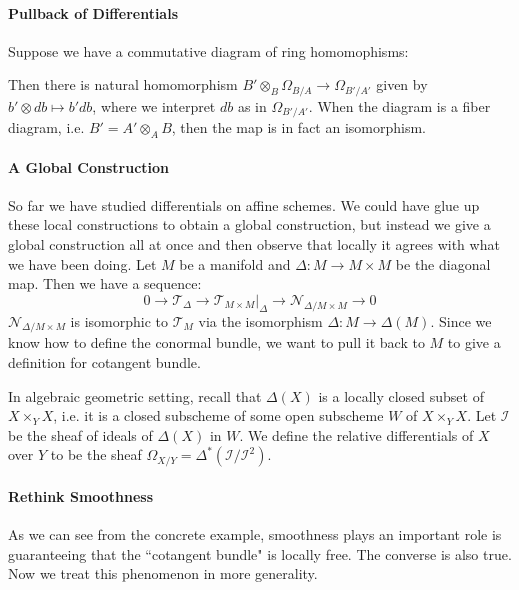 \documentclass[12pt]{article}
\theoremstyle{plain}
\theoremstyle{definition}
\newcommand{\shI}{\mathscr{I}}
\newcommand{\shN}{\mathscr{N}}
\newcommand{\shT}{\mathscr{T}}
\newcommand\tensor{{\otimes}}
\newcommand{\<}{\langle}
\renewcommand{\>}{\rangle}
\newcommand{\Ohm}{\Omega}
\begin{document}
\paragraph{Pullback of Differentials}
Suppose we have a commutative diagram of ring homomophisms: 
\begin{center}
\end{center}
Then there is natural homomorphism $B' \tensor_B \Ohm_{B/A} \to \Ohm_{B'/A'}$ given by $b' \tensor db \mapsto b' db$, where we interpret $db$ as in $\Ohm_{B'/A'}$. When the diagram is a fiber diagram, i.e. $B' = A' \tensor_A B$, then the map is in fact an isomorphism. 



\paragraph{A Global Construction} So far we have studied differentials on affine schemes. We could have glue up these local constructions to obtain a global construction, but instead we give a global construction all at once and then observe that locally it agrees with what we have been doing. Let $M$ be a manifold and $\Delta : M \to M \times M$ be the diagonal map. Then we have a sequence:
$$ 0 \to \shT_\Delta \to \shT_{M \times M}|_{\Delta} \to \shN_{\Delta/M \times M} \to 0$$
$\shN_{\Delta/M \times M}$ is isomorphic to $\shT_M$ via the isomorphism $\Delta : M \to \Delta(M)$. Since we know how to define the conormal bundle, we want to pull it back to $M$ to give a definition for cotangent bundle. 

In algebraic geometric setting, recall that $\Delta(X)$ is a locally closed subset of $X \times_Y X$, i.e. it is a closed subscheme of some open subscheme $W$ of $X \times_Y X$. Let $\shI$ be the sheaf of ideals of $\Delta(X)$ in $W$. We define the relative differentials of $X$ over $Y$ to be the sheaf $\Ohm_{X/Y} = \Delta^*(\shI / \shI^2)$. 

\paragraph{Rethink Smoothness} As we can see from the concrete example, smoothness plays an important role is guaranteeing that the ``cotangent bundle" is locally free. The converse is also true. Now we treat this phenomenon in more generality. 
\end{document}
